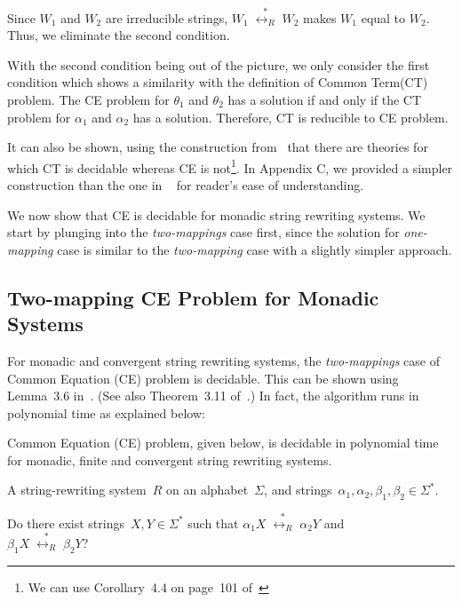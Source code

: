 \documentclass{lmcs} %
\theoremstyle{plain}\newtheorem{satz}[thm]{Satz} %
\begin{document}
Since $W_1$ and $W_2$ are irreducible strings, $W_1 \;
\stackrel{*}{{\longleftrightarrow}_R} \; W_2$ makes $W_1$ equal to
$W_2$. Thus, we eliminate the second condition. 

With the second condition being out of the picture, we only consider the first condition which shows a similarity with the definition of Common Term(CT) problem. The CE problem for $\theta_1$ and $\theta_2$ has a solution
if and only if the CT problem for $\alpha_1$ and $\alpha_2$ has a solution. Therefore, CT is reducible to CE problem.

It can also be shown, using the construction
from~\cite{NarendranOtto97} that there are theories for which
CT is decidable whereas CE is not\footnote{We can use Corollary~4.4
  on page~101 of~\cite{NarendranOtto97}}. In Appendix C, 
  we provided a simpler construction than the one in ~\cite{NarendranOtto97} for reader's ease of understanding.
  
We now show that CE is decidable for monadic string rewriting
systems.  We start by plunging into the \emph{two-mappings} case
first, since the solution for \emph{one-mapping} case is similar
to the \emph{two-mapping} case with a slightly simpler approach.

\subsection{Two-mapping CE Problem for Monadic Systems}
For monadic and convergent string rewriting systems, the \emph{two-mappings} case of Common
Equation (CE) problem is decidable. This can be
shown using Lemma~3.6 in~\cite{OND98}. (See also
Theorem~3.11 of~\cite{OND98}.) In fact, the algorithm runs
in polynomial time as explained below:%

\begin{thm}
{\label{CEFirstTheorem}}
Common Equation (CE) problem, given below, is decidable in polynomial
time for monadic,
finite and convergent string rewriting systems.
\begin{description}[align=left]
\item[Input] A string-rewriting system~$R$ on an alphabet~$\Sigma$, and 
strings~$\alpha_1, \alpha_2, \beta_1, \beta_2 \in \Sigma_{}^*$.
\item[Question] Do there exist strings~$X, Y \in \Sigma^*$ such that 
$\alpha_1 X \; \stackrel{*}{{\longleftrightarrow}_R} \; \alpha_2 Y$ and \\
$\beta_1 X \; \stackrel{*}{{\longleftrightarrow}_R} \; \beta_2 Y$?
\end{description}
\end{thm}
\end{document}
